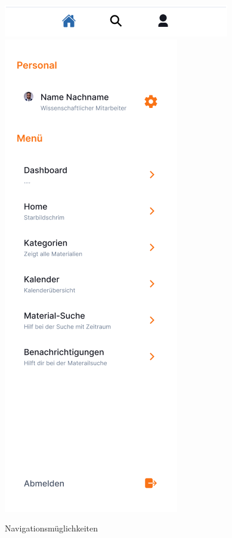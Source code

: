 \begin{figure}[h]
    \centering
    \includegraphics[scale=0.3]{Bilder/Prototyp/Property 1=Variant2.png}
    \includegraphics[scale=0.4]{Bilder/Prototyp/Menu.png}
    \caption[Farbpalette]{Navigationsmüglichkeiten}
    \label{fig:nav}
\end{figure}



